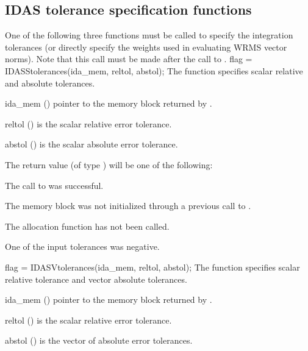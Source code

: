\subsection{IDAS tolerance specification functions}\label{sss:idatolerances}
One of the following three functions must be called to specify the
integration tolerances (or directly specify the weights used in
evaluating WRMS vector norms).  Note that this call must be made after
the call to .
{
  flag = IDASStolerances(ida\_mem, reltol, abstol);
}
{
  The function  specifies scalar relative and absolute
  tolerances.
}
{
  \begin{args}
  \item[ida\_mem] ()
    pointer to the {\idas} memory block returned by .
  \item[reltol] ()
    is the scalar relative error tolerance.
  \item[abstol] ()
    is the scalar absolute error tolerance.
  \end{args}
}
{
  The return value  (of type ) will be one of the following:
  \begin{args}
  \item[\Id{IDA\_SUCCESS}]
    The call to  was successful.
  \item[\Id{IDA\_MEM\_NULL}] 
    The {\idas} memory block was not initialized through a previous call to
    .
  \item[\Id{IDA\_NO\_MALLOC}] 
    The allocation function  has not been called.
  \item[\Id{IDA\_ILL\_INPUT}] 
    One of the input tolerances was negative.
  \end{args}
}
{}
{
  flag = IDASVtolerances(ida\_mem, reltol, abstol);
}
{
  The function  specifies scalar relative tolerance and
  vector absolute tolerances.
}
{
  \begin{args}
  \item[ida\_mem] ()
    pointer to the {\idas} memory block returned by .
  \item[reltol] ()
    is the scalar relative error tolerance.
  \item[abstol] ()
    is the vector of absolute error tolerances.
  \end{args}
}
